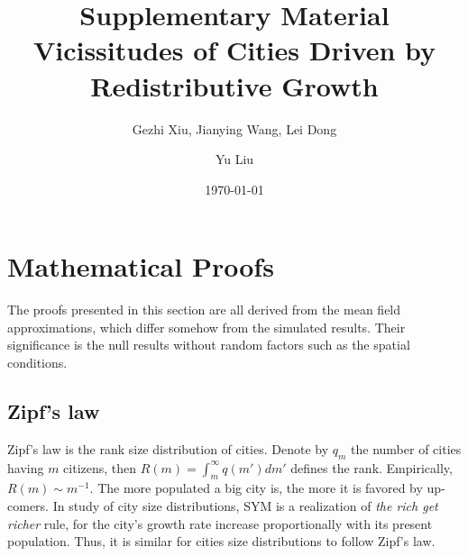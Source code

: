 \documentclass[aps,prl]{revtex4-2}
\begin{document}
\title{Supplementary Material\\Vicissitudes of Cities Driven by Redistributive Growth}
\date{\today}
\author{Gezhi Xiu, Jianying Wang, Lei Dong}

\author{Yu Liu}

\pacs{} 



\maketitle
\tableofcontents
\vspace{1cm}

\section{Mathematical Proofs}

The proofs presented in this section are all derived from the mean field approximations, which differ somehow from the simulated results. Their significance is the null results without random factors such as the spatial conditions.

\subsection{Zipf's law}

Zipf's law is the rank size distribution of cities. Denote by $q_m$ the number of cities having $m$ citizens, then $R(m) = \int_m^\infty q(m')dm'$ defines the rank. Empirically, $R(m)\sim m^{-1}$. The more populated a big city is, the more it is favored by up-comers. In study of city size distributions, SYM is a realization of \emph{the rich get richer} rule, for the city's growth rate increase proportionally with its present population. Thus, it is similar for cities size distributions to follow Zipf's law. 
\end{document}
